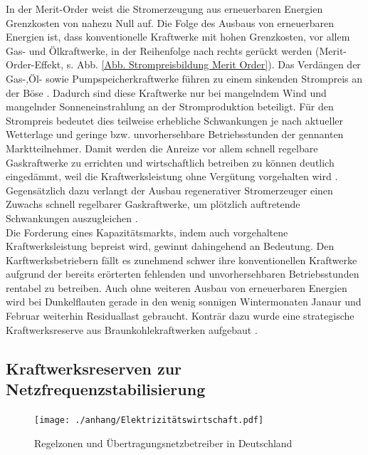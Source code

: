 		In der Merit-Order weist die Stromerzeugung aus erneuerbaren Energien Grenzkosten von nahezu Null auf.
		Die Folge des Ausbaus von erneuerbaren Energien ist, dass konventionelle Kraftwerke mit hohen Grenzkosten, vor allem Gas- und Ölkraftwerke, in der Reihenfolge nach rechts gerückt werden (Merit-Order-Effekt, s. Abb. \ref{Abb. Strompreisbildung Merit Order}).
		Das Verdängen der Gas-,Öl- sowie Pumpspeicherkraftwerke führen zu einem sinkenden Strompreis an der Böse \parencite{Frauenhofer_PV_Bericht}.
		Dadurch sind diese Kraftwerke nur bei mangelndem Wind und mangelnder Sonneneinstrahlung an der Stromproduktion beteiligt.
		Für den Strompreis bedeutet dies teilweise erhebliche Schwankungen je nach aktueller Wetterlage und geringe bzw. unvorhersehbare Betriebsstunden der gennanten Marktteilnehmer. 
		Damit werden die Anreize vor allem schnell regelbare Gaskraftwerke zu errichten und wirtschaftlich betreiben zu können deutlich eingedämmt, weil die Kraftwerksleistung ohne Vergütung vorgehalten wird \parencite{Frauenhofer_PV_Bericht}.
		Gegensätzlich dazu verlangt der Ausbau regenerativer Stromerzeuger einen Zuwachs schnell regelbarer Gaskraftwerke, um plötzlich auftretende Schwankungen auszugleichen \parencite{Doktorarbeit_Reitsam}. \\
		
		Die Forderung eines Kapazitätsmarkts, indem auch vorgehaltene Kraftwerksleistung bepreist wird, gewinnt dahingehend an Bedeutung.
		Den Karftwerksbetriebern fällt es zunehmend schwer ihre konventionellen Kraftwerke aufgrund der bereits erörterten fehlenden und unvorhersehbaren Betriebsstunden rentabel zu betreiben.
		Auch ohne weiteren Ausbau von erneuerbaren Energien wird bei Dunkelflauten gerade in den wenig sonnigen Wintermonaten Janaur und Februar weiterhin Residuallast gebraucht.
		Konträr dazu wurde eine strategische Kraftwerksreserve aus Braunkohlekraftwerken aufgebaut \parencite{bbh_blog}.		
				
	\subsection{Kraftwerksreserven zur Netzfrequenzstabilisierung}
	
		\begin{figure}
			\centering
			\texttt{[image: ./anhang/Elektrizitätswirtschaft.pdf]}
			\caption{Regelzonen und Übertragungsnetzbetreiber in Deutschland \parencite{Elektrizitätswirtschaft}}
			\label{Abb. Regelzonen Deutschland}
		\end{figure}
	
